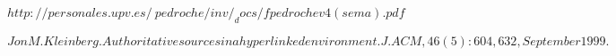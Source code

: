 \begin{thebibliography}{9}

  $http://personales.upv.es/~pedroche/inv/_docs/fpedrochev4(sema).pdf$

$Jon M. Kleinberg. Authoritative sources in a hyperlinked environment. J. ACM,
46(5):604,632, September 1999.$
\end{thebibliography}